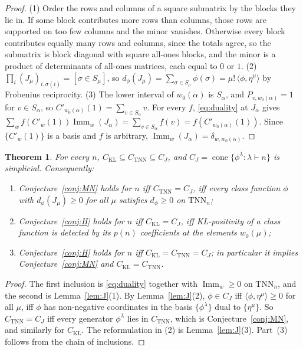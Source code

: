 \documentclass[11pt]{amsart}
\newtheorem{theorem}{Theorem}[section]
\theoremstyle{definition}
\theoremstyle{remark}
\newcommand{\Imm}{\operatorname{Imm}}
\newcommand{\TNN}{\mathrm{TNN}}
\newcommand{\CKL}{C_{\mathrm{KL}}}
\newcommand{\CTNN}{C_{\mathrm{TNN}}}
\newcommand{\CJ}{C_{J}}
\newcommand{\Cp}[1]{C'_{#1}(1)}
\begin{document}
\begin{proof}
(1) Order the rows and columns of a square submatrix by the blocks they lie in. If some block contributes more rows than columns, those rows are supported on too few columns and the minor vanishes. Otherwise every block contributes equally many rows and columns, since the totals agree, so the submatrix is block diagonal with square all-ones blocks, and the minor is a product of determinants of all-ones matrices, each equal to $0$ or $1$.
(2) $\prod_i(J_\mu)_{i,\sigma(i)}=[\sigma\in S_\mu]$, so $d_\phi(J_\mu)=\sum_{\sigma\in S_\mu}\phi(\sigma)=\mu!\,\langle\phi,\eta^\mu\rangle$ by Frobenius reciprocity.
(3) The lower interval of $w_0(\alpha)$ is $S_\alpha$, and $P_{v,w_0(\alpha)}=1$ for $v\in S_\alpha$, so $\Cp{w_0(\alpha)}=\sum_{v\in S_\alpha}v$. For every $f$, \eqref{eq:duality} at $J_\alpha$ gives $\sum_wf(\Cp w)\Imm_w(J_\alpha)=\sum_{v\in S_\alpha}f(v)=f(\Cp{w_0(\alpha)})$. Since $\{\Cp w\}$ is a basis and $f$ is arbitrary, $\Imm_w(J_\alpha)=\delta_{w,w_0(\alpha)}$.
\end{proof}

\begin{theorem}\label{thm:cones}
For every $n$, $\CKL\subseteq\CTNN\subseteq\CJ$, and $\CJ=\operatorname{cone}\{\phi^\lambda:\lambda\vdash n\}$ is simplicial. Consequently:
\begin{enumerate}
\item Conjecture~\ref{conj:MN} holds for $n$ iff $\CTNN=\CJ$, iff every class function $\phi$ with $d_\phi(J_\mu)\ge0$ for all $\mu$ satisfies $d_\phi\ge0$ on $\TNN_n$;
\item Conjecture~\ref{conj:H} holds for $n$ iff $\CKL=\CJ$, iff KL-positivity of a class function is detected by its $p(n)$ coefficients at the elements $w_0(\mu)$;
\item Conjecture~\ref{conj:H} holds for $n$ iff $\CKL=\CTNN=\CJ$; in particular it implies Conjecture~\ref{conj:MN} and $\CKL=\CTNN$.
\end{enumerate}
\end{theorem}

\begin{proof}
The first inclusion is \eqref{eq:duality} together with $\Imm_w\ge0$ on $\TNN_n$, and the second is Lemma~\ref{lem:J}(1). By Lemma~\ref{lem:J}(2), $\phi\in\CJ$ iff $\langle\phi,\eta^\mu\rangle\ge0$ for all $\mu$, iff $\phi$ has non-negative coordinates in the basis $\{\phi^\lambda\}$ dual to $\{\eta^\mu\}$. So $\CTNN=\CJ$ iff every generator $\phi^\lambda$ lies in $\CTNN$, which is Conjecture~\ref{conj:MN}, and similarly for $\CKL$. The reformulation in (2) is Lemma~\ref{lem:J}(3). Part~(3) follows from the chain of inclusions.
\end{proof}
\end{document}
